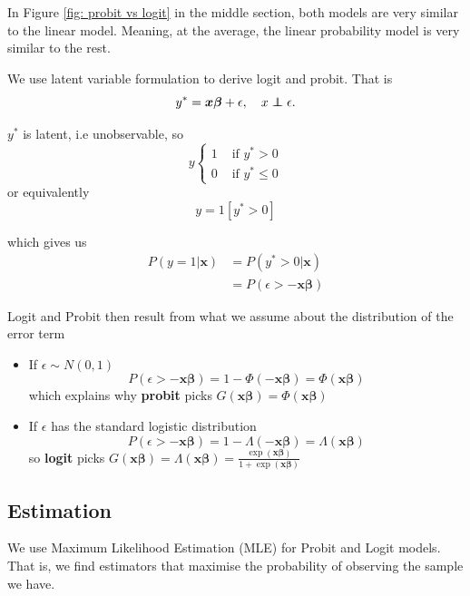 \documentclass[11pt]{article}
\begin{document}
\begin{note}
    In Figure \ref{fig: probit vs logit} in the middle section, both models are very similar to the linear model. Meaning, at the average, the linear probability model is very similar to the rest.
\end{note}


\begin{procedure}
    We use latent variable formulation to derive logit and probit. That is
    \[y^* = \boldsymbol{x\beta} + \epsilon, \quad x \indep \epsilon.\]

    $y^*$ is latent, i.e unobservable, so
    \[y \begin{cases}
        1 & \text{ if } y^*>0 \\
        0 & \text{ if } y^* \leq 0
    \end{cases}\]
    or equivalently
    \[y = 1[y^*>0]\]

    which gives us
    \begin{align*}
        P(y=1|\boldsymbol{x}) &= P(y^*>0|\boldsymbol{x}) \\
        &= P(\epsilon> - \boldsymbol{x\beta})
    \end{align*}

    
\end{procedure}

Logit and Probit then result from what we assume about the distribution of the error term
    \begin{itemize}
        \item If $\epsilon \sim N(0,1)$ 
        \[P(\epsilon > - \boldsymbol{x\beta}) = 1 - \Phi (-\boldsymbol{x\beta}) = \Phi(\boldsymbol{x\beta})\]
        which explains why \textbf{probit} picks $G(\boldsymbol{x\beta}) = \Phi( \boldsymbol{x\beta})$
        \item If $\epsilon$ has the standard logistic distribution
        \[P(\epsilon > - \boldsymbol{x\beta}) = 1- \Lambda (- \boldsymbol{x\beta}) = \Lambda(\boldsymbol{x\beta})\]
        so \textbf{logit} picks $G(\boldsymbol{x\beta}) = \Lambda(\boldsymbol{x\beta}) = \frac{\exp{(\boldsymbol{x\beta})}}{1 + \exp{(\boldsymbol{x\beta})}}$
    \end{itemize}


\subsection{Estimation}

We use Maximum Likelihood Estimation (MLE) for Probit and Logit models. That is, we find estimators that maximise the probability of observing the sample we have.
\end{document}
